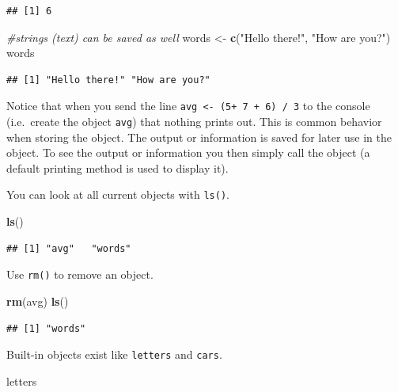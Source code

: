 \documentclass[
]{book}
\newenvironment{Shaded}{\begin{snugshade}}{\end{snugshade}}
\newcommand{\CommentTok}[1]{\textcolor[rgb]{0.56,0.35,0.01}{\textit{#1}}}
\newcommand{\KeywordTok}[1]{\textcolor[rgb]{0.13,0.29,0.53}{\textbf{#1}}}
\newcommand{\NormalTok}[1]{#1}
\newcommand{\StringTok}[1]{\textcolor[rgb]{0.31,0.60,0.02}{#1}}
\theoremstyle{definition}
\theoremstyle{definition}
\theoremstyle{definition}
\theoremstyle{remark}
\begin{document}
\begin{verbatim}
## [1] 6
\end{verbatim}

\begin{Shaded}
\begin{Highlighting}[]
\CommentTok{#strings (text) can be saved as well}
\NormalTok{words <-}\StringTok{ }\KeywordTok{c}\NormalTok{(}\StringTok{"Hello there!"}\NormalTok{, }\StringTok{"How are you?"}\NormalTok{)}
\NormalTok{words}
\end{Highlighting}
\end{Shaded}

\begin{verbatim}
## [1] "Hello there!" "How are you?"
\end{verbatim}

Notice that when you send the line \texttt{avg\ \textless{}-\ (5+\ 7\ +\ 6)\ /\ 3} to the console (i.e.~create the object \texttt{avg}) that nothing prints out. This is common behavior when storing the object. The output or information is saved for later use in the object. To see the output or information you then simply call the object (a default printing method is used to display it).

You can look at all current objects with \texttt{ls()}.

\begin{Shaded}
\begin{Highlighting}[]
\KeywordTok{ls}\NormalTok{()}
\end{Highlighting}
\end{Shaded}

\begin{verbatim}
## [1] "avg"   "words"
\end{verbatim}

Use \texttt{rm()} to remove an object.

\begin{Shaded}
\begin{Highlighting}[]
\KeywordTok{rm}\NormalTok{(avg)}
\KeywordTok{ls}\NormalTok{()}
\end{Highlighting}
\end{Shaded}

\begin{verbatim}
## [1] "words"
\end{verbatim}

Built-in objects exist like \texttt{letters} and \texttt{cars}.

\begin{Shaded}
\begin{Highlighting}[]
\NormalTok{letters}
\end{Highlighting}
\end{Shaded}
\end{document}
